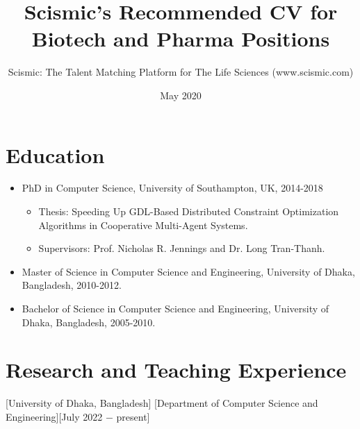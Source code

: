 \documentclass{article}
\title{Scismic's Recommended CV for Biotech and Pharma Positions}
\author{Scismic: The Talent Matching Platform for The Life Sciences (www.scismic.com)}
\date{May 2020}
\begin{document}

\makecvtitle %

 
\section{Education}

\begin{itemize}
\item PhD in Computer Science, University of Southampton, UK, 2014-2018
\begin{itemize}
\item Thesis: Speeding Up GDL-Based Distributed Constraint Optimization
Algorithms in Cooperative Multi-Agent Systems.
\item Supervisors: Prof. Nicholas R. Jennings and Dr. Long Tran-Thanh.
\end{itemize}

\item Master of Science in Computer Science and Engineering, University of Dhaka, Bangladesh, 2010-2012.
\begin{itemize}
\end{itemize}


\item Bachelor of Science in Computer Science and Engineering, University of Dhaka, Bangladesh, 2005-2010.
\begin{itemize}
\end{itemize}
\end{itemize}

\section{Research and Teaching Experience}

[University of Dhaka, Bangladesh]
[Department of Computer Science and Engineering][July 2022 $-$ present]
\vspace{1mm}
\end{document}
